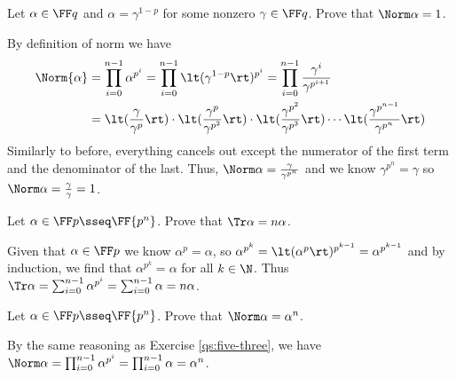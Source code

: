 \documentclass{article}
\begin{document}
\begin{subexercise} %
Let \( \alpha\in\FF q \) and \( \alpha=\gamma^{1-p} \) for some nonzero \( \gamma\in\FF q \).
Prove that \( \Norm \alpha = 1 \).
\end{subexercise}
\begin{solution}
By definition of norm we have \begin{align*}
  \Norm{\alpha} &= \prod_{i=0}^{n-1} \alpha^{p^i} = \prod_{i=0}^{n-1} \lt(\gamma^{1-p}\rt)^{p^i} = \prod_{i=0}^{n-1} \frac{\gamma^i}{\gamma^{p^{i+1}}} \\
  &= \lt(\frac{\gamma}{\gamma^p}\rt) \cdot \lt(\frac{\gamma^p}{\gamma^{p^2}}\rt) \cdot \lt(\frac{\gamma^{p^2}}{\gamma^{p^3}}\rt) \cdots \lt(\frac{\gamma^{p^{n-1}}}{\gamma^{p^n}}\rt)
\end{align*}
Similarly to before, everything cancels out except the numerator of the first term and the denominator of the last.
Thus, \( \Norm \alpha = \frac{\gamma}{\gamma^{p^n}} \) and we know \( \gamma^{p^n} = \gamma \) so \( \Norm \alpha = \frac{\gamma}{\gamma} = 1 \).
\end{solution}

\begin{subexercise} %
  \label{qs:five-three}
  Let \( \alpha\in\FF p \sseq \FF{p^n} \).
  Prove that \( \Tr \alpha = n\alpha \).
\end{subexercise}
\begin{solution}
Given that \( \alpha\in\FF p \) we know \( \alpha^p = \alpha \), so \( \alpha^{p^k} = \lt(\alpha^{p}\rt)^{p^{k-1}} = \alpha^{p^{k-1}} \) and by induction, we find that \( \alpha^{p^k} = \alpha \) for all \( k\in\N \).
Thus \( \Tr \alpha = \sum_{i=0}^{n-1} \alpha^{p^i} = \sum_{i=0}^{n-1} \alpha = n\alpha \).
\end{solution}

\begin{subexercise} %
  Let \( \alpha\in\FF p \sseq \FF{p^n} \).
  Prove that \( \Norm \alpha = \alpha^n \).
\end{subexercise}
\begin{solution}
  By the same reasoning as Exercise \ref{qs:five-three}, we have \( \Norm \alpha = \prod_{i=0}^{n-1} \alpha^{p^i} = \prod_{i=0}^{n-1} \alpha = \alpha^n \).
\end{solution}
\end{document}
